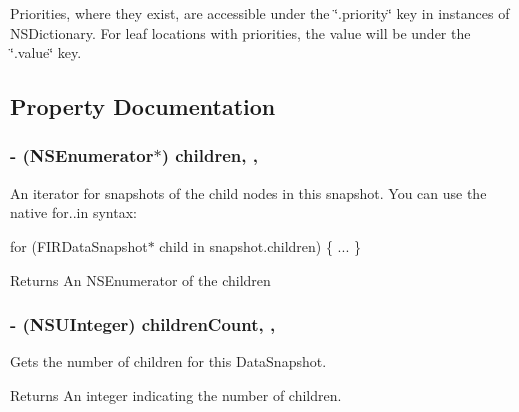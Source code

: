 Priorities, where they exist, are accessible under the \char`\"{}.\+priority\char`\"{} key in instances of N\+S\+Dictionary. For leaf locations with priorities, the value will be under the \char`\"{}.\+value\char`\"{} key. 

\subsection{Property Documentation}
\hypertarget{interface_f_i_r_data_snapshot_aa141d84d6f0575a3095908a1605daf4d}{}
\subsubsection[{children}]{\setlength{\rightskip}{0pt plus 5cm}-\/ (N\+S\+Enumerator$\ast$) children\hspace{0.3cm}{\ttfamily [read]}, {\ttfamily [nonatomic]}, {\ttfamily [strong]}}\label{interface_f_i_r_data_snapshot_aa141d84d6f0575a3095908a1605daf4d}
An iterator for snapshots of the child nodes in this snapshot. You can use the native for..in syntax\+:

for (F\+I\+R\+Data\+Snapshot$\ast$ child in snapshot.\+children) \{ ... \}

\begin{DoxyReturn}{Returns}
An N\+S\+Enumerator of the children 
\end{DoxyReturn}
\hypertarget{interface_f_i_r_data_snapshot_a342c472d1faade7a52faa1cc8530c9b4}{}
\subsubsection[{children\+Count}]{\setlength{\rightskip}{0pt plus 5cm}-\/ (N\+S\+U\+Integer) children\+Count\hspace{0.3cm}{\ttfamily [read]}, {\ttfamily [nonatomic]}, {\ttfamily [assign]}}\label{interface_f_i_r_data_snapshot_a342c472d1faade7a52faa1cc8530c9b4}
Gets the number of children for this Data\+Snapshot.

\begin{DoxyReturn}{Returns}
An integer indicating the number of children. 
\end{DoxyReturn}
\hypertarget{interface_f_i_r_data_snapshot_a84dcc624075720e171f27b8e9ee8c678}{}
